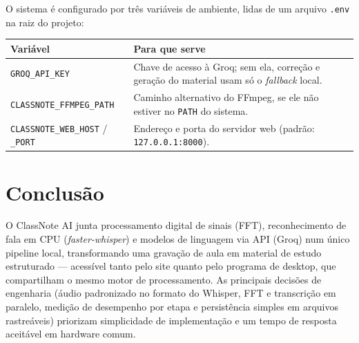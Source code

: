 \documentclass[11pt,a4paper]{article}
\begin{document}
O sistema é configurado por três variáveis de ambiente, lidas de um arquivo \texttt{.env} na raiz do projeto:

\begin{center}
\begin{tabular}{@{}p{4.4cm}p{9.2cm}@{}}
\toprule
\textbf{Variável} & \textbf{Para que serve} \\
\midrule
\texttt{GROQ\_API\_KEY} & Chave de acesso à Groq; sem ela, correção e geração do material usam só o \emph{fallback} local. \\
\texttt{CLASSNOTE\_FFMPEG\_PATH} & Caminho alternativo do FFmpeg, se ele não estiver no \texttt{PATH} do sistema. \\
\texttt{CLASSNOTE\_WEB\_HOST} / \texttt{\_PORT} & Endereço e porta do servidor web (padrão: \texttt{127.0.0.1:8000}). \\
\bottomrule
\end{tabular}
\end{center}

\section{Conclusão}

O ClassNote AI junta processamento digital de sinais (FFT), reconhecimento de fala em CPU (\emph{faster-whisper}) e modelos de linguagem via API (Groq) num único pipeline local, transformando uma gravação de aula em material de estudo estruturado --- acessível tanto pelo site quanto pelo programa de desktop, que compartilham o mesmo motor de processamento. As principais decisões de engenharia (áudio padronizado no formato do Whisper, FFT e transcrição em paralelo, medição de desempenho por etapa e persistência simples em arquivos rastreáveis) priorizam simplicidade de implementação e um tempo de resposta aceitável em hardware comum.
\end{document}
